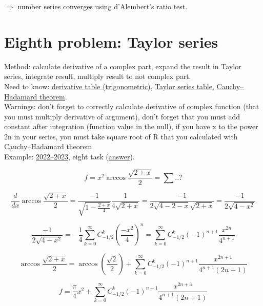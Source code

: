 \documentclass{article}
\begin{document}
     $\Rightarrow$ number series converges using d'Alembert's ratio test.


\newpage
\section{Eighth problem: Taylor series}
Method: calculate derivative of a complex part, expand the result in Taylor series, integrate result, multiply result to not complex part. \\
Need to know: \hyperlink{8.1}{derivative table (trigonometric)}, \hyperlink{8.2}{Taylor series table}, \hyperlink{8.3}{Cauchy–Hadamard theorem}. \\
Warnings: don't forget to correctly calculate derivative of complex function (that you must multiply derivative of argument), don't forget that you must add constant after integration (function value in the null), if you have x to the power 2n in your series, you must take square root of R that you calculated with Cauchy–Hadamard theorem \\
Example: \href{https://old.mipt.ru/education/chair/mathematics/exams/exams/2022-23/%D0%9C%D0%90%D0%98%D0%B8%D0%A0_%D0%92_23.pdf}{2022–2023}, eight task (\href{https://old.mipt.ru/education/chair/mathematics/exams/exams/2022-23/%D0%9C%D0%90%D0%98%D0%B8%D0%A0_%D0%92_23%D0%BE%D1%82%D0%B2%D0%B5%D1%82%D1%8B.pdf}{answer}).

\begin{equation}
    f = x^2 \arccos \frac{\sqrt{2+x}}{2} = \sum ..?
\end{equation}

\begin{equation*}
    \frac{d}{dx} \arccos \frac{\sqrt{2+x}}{2} = \frac{-1}{\sqrt{1-\frac{2+x}{4}}} \frac{1}{4\sqrt{2+x}} = \frac{-1}{2\sqrt{4-2-x}\sqrt{2+x}} = \frac{-1}{2\sqrt{4-x^2}}
\end{equation*}

\begin{equation*}
    \frac{-1}{2\sqrt{4-x^2}} = -\frac{1}{4}\sum_{k=0}^{\infty} C_{-1/2}^{k} (\frac{-x^2}{4})^{n} = \sum_{k=0}^{\infty} C_{-1/2}^{k} (-1)^{n+1} \frac{x^{2n}}{4^{n+1}}
\end{equation*}

\begin{equation*}
    \arccos \frac{\sqrt{2+x}}{2} = \arccos (\frac{\sqrt{2}}{2}) + \sum_{k=0}^{\infty} C_{-1/2}^{k} (-1)^{n+1} \frac{x^{2n+1}}{4^{n+1} (2n+1)}
\end{equation*}

\begin{equation}
    f = \frac{\pi}{4} x^2 + \sum_{k=0}^{\infty} C_{-1/2}^{k} (-1)^{n+1} \frac{x^{2n+3}}{4^{n+1} (2n+1)}
\end{equation}
\end{document}
